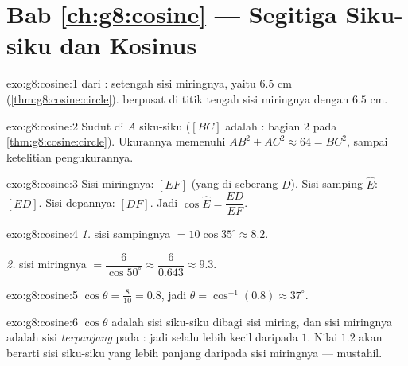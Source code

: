 \section*{Bab \ref{ch:g8:cosine} --- Segitiga Siku-siku dan Kosinus}

\begin{solution}{exo:g8:cosine:1}
 dari : setengah sisi miringnya, yaitu
$6.5$ cm (\cref{thm:g8:cosine:circle}).  berpusat
di titik tengah sisi miringnya dengan  $6.5$ cm.
\end{solution}

\begin{solution}{exo:g8:cosine:2}
Sudut di $A$ siku-siku ($[BC]$ adalah : bagian 2 pada
\cref{thm:g8:cosine:circle}). Ukurannya memenuhi
$AB^2 + AC^2 \approx 64 = BC^2$, sampai ketelitian pengukurannya.
\end{solution}

\begin{solution}{exo:g8:cosine:3}
Sisi miringnya: $[EF]$ (yang di seberang  $D$). Sisi
samping $\widehat E$: $[ED]$. Sisi depannya: $[DF]$. Jadi
$\cos\widehat E = \dfrac{ED}{EF}$.
\end{solution}

\begin{solution}{exo:g8:cosine:4}
\emph{1.} sisi sampingnya $= 10 \cos 35^\circ \approx 8.2$.

\emph{2.} sisi miringnya $= \dfrac{6}{\cos 50^\circ} \approx
\dfrac{6}{0.643} \approx 9.3$.
\end{solution}

\begin{solution}{exo:g8:cosine:5}
$\cos\theta = \frac{8}{10} = 0.8$, jadi
$\theta = \cos^{-1}(0.8) \approx 37^\circ$.
\end{solution}

\begin{solution}{exo:g8:cosine:6}
$\cos\theta$ adalah sisi siku-siku dibagi sisi miring, dan sisi
miringnya adalah sisi \emph{terpanjang} pada : jadi
 selalu lebih kecil daripada $1$. Nilai $1.2$ akan
berarti sisi siku-siku yang lebih panjang daripada sisi miringnya ---
mustahil.
\end{solution}

